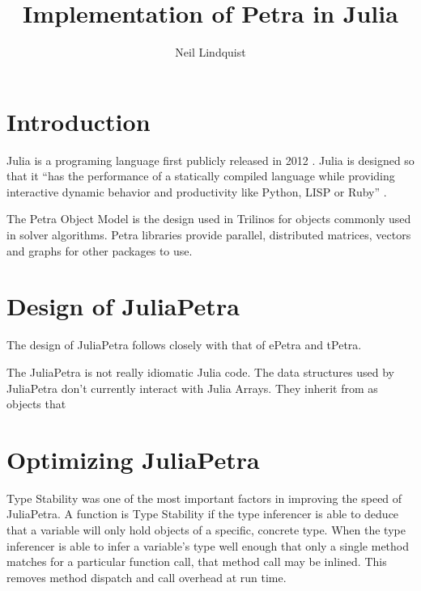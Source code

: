 \documentclass{article}
\title{Implementation of Petra in Julia}
\author{Neil Lindquist}
\newcommand{\juliaSnippet}[1]{\texttt{\detokenize{#1}}}
\begin{document}
\maketitle

\section{Introduction}

Julia is a programing language first publicly released in 2012 \cite{WhyWeCreatedJulia}.
Julia is designed so that it
``has the performance of a statically compiled
language while providing interactive dynamic behavior and productivity like Python, LISP or
Ruby'' \cite{JuliaDesignPaper}.

The Petra Object Model is the design used in Trilinos for objects commonly used in solver algorithms.
\cite{OverviewOfTrilinos}
Petra libraries provide parallel, distributed matrices, vectors and graphs for other packages to use.

\section{Design of JuliaPetra}

The design of JuliaPetra follows closely with that of ePetra and tPetra.


The JuliaPetra is not really idiomatic Julia code.
The data structures used by JuliaPetra don't currently interact with Julia Arrays.
They inherit from \juliaSnippet{DistObject} as objects that



\section{Optimizing JuliaPetra}

Type Stability was one of the most important factors in improving the speed of JuliaPetra.
A function is Type Stability if the type inferencer is able to deduce that a variable will only
hold objects of a specific, concrete type.
When the type inferencer is able to infer a variable's type well enough that only a single
method matches for a particular function call, that method call may be inlined. \cite{JuliaDesignPaper}
This removes method dispatch and call overhead at run time.
\end{document}
